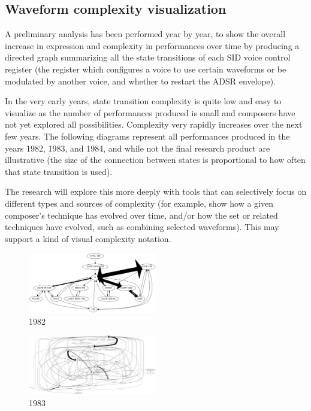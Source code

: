 \documentclass[10pt]{article}
\begin{document}
\begin{multicols*}{2}
\subsection{Waveform complexity visualization}

A preliminary analysis has been performed year by year, to show the overall increase in expression and complexity in performances over time by producing a directed graph summarizing all the state transitions of each SID voice control register (the register which configures a voice to use certain waveforms or be modulated by another voice, and whether to restart the ADSR envelope).

In the very early years, state transition complexity is quite low and easy to visualize as the number of performances produced is small and composers have not yet explored all possibilities. Complexity very rapidly increases over the next few years. The following diagrams represent all performances produced in the years 1982, 1983, and 1984, and while not the final research product are illustrative (the size of the connection between states is proportional to how often that state transition is used).

The research will explore this more deeply with tools that can selectively focus on different types and sources of complexity (for example, show how a given composer’s technique has evolved over time, and/or how the set or related techniques have evolved, such as combining selected waveforms). This may support a kind of visual complexity notation.

\begin{figure}[H]
\includegraphics[width=0.5\textwidth]{1982}
\caption{1982}
\end{figure}

\begin{figure}[H]
\includegraphics[width=0.5\textwidth]{1983}
\caption{1983}
\end{figure}


\end{multicols*}
\end{document}
